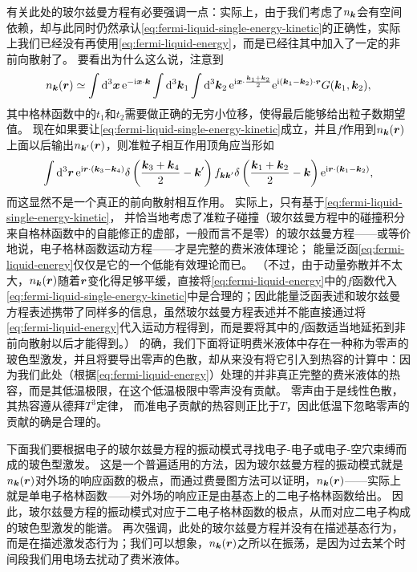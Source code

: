 有关此处的玻尔兹曼方程有必要强调一点：实际上，由于我们考虑了$n_{\vb*{k}}$会有空间依赖，却与此同时仍然承认\eqref{eq:fermi-liquid-single-energy-kinetic}的正确性，实际上我们已经没有再使用\eqref{eq:fermi-liquid-energy}，而是已经往其中加入了一定的非前向散射了。
要看出为什么这么说，注意到
\begin{equation}
    n_{\vb*{k}}(\vb*{r}) \simeq 
    \int \dd[3]{\vb*{x}} \mathrm{e}^{- \mathrm{i} \vb*{x} \cdot \vb*{k}}
    \int \dd[3]{\vb*{k}_1} \int \dd[3]{\vb*{k}_2}
    \mathrm{e}^{\mathrm{i} \vb*{x} \cdot \frac{\vb*{k}_1 + \vb*{k}_2}{2}}
    \mathrm{e}^{\mathrm{i} (\vb*{k}_1 - \vb*{k}_2) \cdot \vb*{r}} G(\vb*{k}_1, \vb*{k}_2),
\end{equation}
其中格林函数中的$t_1$和$t_2$需要做正确的无穷小位移，使得最后能够给出粒子数期望值。
现在如果要让\eqref{eq:fermi-liquid-single-energy-kinetic}成立，并且$f$作用到$n_{\vb*{k}}(\vb*{r})$上面以后输出$n_{\vb*{k}'}(\vb*{r})$，则准粒子相互作用顶角应当形如
\[
    \int \dd[3]{\vb*{r}} \mathrm{e}^{\mathrm{i} \vb*{r} \cdot (\vb*{k}_3 - \vb*{k}_4)} 
    \delta \left( \frac{\vb*{k}_3 + \vb*{k}_4}{2} - \vb*{k}' \right)
    f_{\vb*{k} \vb*{k}'}
    \delta\left( \frac{\vb*{k}_1 + \vb*{k}_2}{2} - \vb*{k} \right)
    \mathrm{e}^{\mathrm{i} \vb*{r} \cdot (\vb*{k}_1 - \vb*{k}_2)}, 
\]
而这显然不是一个真正的前向散射相互作用。
实际上，只有基于\eqref{eq:fermi-liquid-single-energy-kinetic}，
并恰当地考虑了准粒子碰撞（玻尔兹曼方程中的碰撞积分来自格林函数中的自能修正的虚部，一般而言不是零）的玻尔兹曼方程——或等价地说，电子格林函数运动方程——才是完整的费米液体理论；
能量泛函\eqref{eq:fermi-liquid-energy}仅仅是它的一个低能有效理论而已。
（不过，由于动量弥散并不太大，$n_{\vb*{k}}(\vb*{r})$随着$\vb*{r}$变化得足够平缓，直接将\eqref{eq:fermi-liquid-energy}中的$f$函数代入\eqref{eq:fermi-liquid-single-energy-kinetic}中是合理的；因此能量泛函表述和玻尔兹曼方程表述携带了同样多的信息，虽然玻尔兹曼方程表述并不能直接通过将\eqref{eq:fermi-liquid-energy}代入运动方程得到，而是要将其中的$f$函数适当地延拓到非前向散射以后才能得到。）
的确，我们下面将证明费米液体中存在一种称为零声的玻色型激发，并且将要导出零声的色散，却从来没有将它引入到热容的计算中：因为我们此处（根据\eqref{eq:fermi-liquid-energy}）处理的并非真正完整的费米液体的热容，而是其低温极限，在这个低温极限中零声没有贡献。
零声由于是线性色散，其热容遵从德拜$T^3$定律，
而准电子贡献的热容则正比于$T$，因此低温下忽略零声的贡献的确是合理的。

下面我们要根据电子的玻尔兹曼方程的振动模式寻找电子-电子或电子-空穴束缚而成的玻色型激发。
这是一个普遍适用的方法，因为玻尔兹曼方程的振动模式就是$n_{\vb*{k}}(\vb*{r})$对外场的响应函数的极点，而通过费曼图方法可以证明，$n_{\vb*{k}}(\vb*{r})$——实际上就是单电子格林函数——对外场的响应正是由基态上的二电子格林函数给出。
因此，玻尔兹曼方程的振动模式对应于二电子格林函数的极点，从而对应二电子构成的玻色型激发的能谱。
再次强调，此处的玻尔兹曼方程并没有在描述基态行为，而是在描述激发态行为；我们可以想象，$n_{\vb*{k}}(\vb*{r})$之所以在振荡，是因为过去某个时间段我们用电场去扰动了费米液体。

